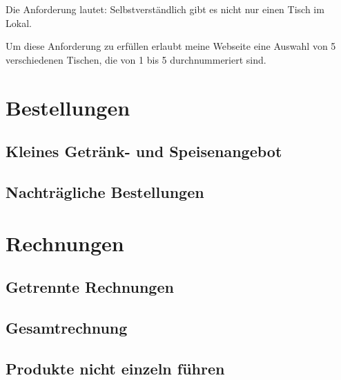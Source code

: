 Die Anforderung lautet: \glqq Selbstverständlich gibt es nicht nur einen Tisch im Lokal.\grqq

Um diese Anforderung zu erfüllen erlaubt meine Webseite eine Auswahl von 5 verschiedenen Tischen, die von 1 bis 5 durchnummeriert sind.


\section{Bestellungen} %
\label{sec:Bestellungen}

\subsection{Kleines Getränk- und Speisenangebot} %
\label{sub:Kleines Getränk- und Speisenangebot}


\subsection{Nachträgliche Bestellungen} %
\label{sub:Nachträgliche Bestellungen}



\section{Rechnungen} %
\label{sec:Rechnungserzeugung}

\subsection{Getrennte Rechnungen} %
\label{sub:Getrennte Rechnungen}


\subsection{Gesamtrechnung} %
\label{sub:Gesamtrechnung}


\subsection{Produkte nicht einzeln führen} %
\label{sub:Produkte nicht einzeln führen}


